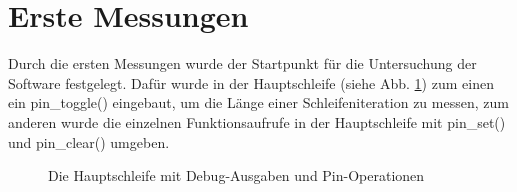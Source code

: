 \section{Erste Messungen}
Durch die ersten Messungen wurde der Startpunkt für die Untersuchung der Software
festgelegt. Dafür wurde in der Hauptschleife (siehe Abb. \ref{main_loop_full}) zum einen
ein pin\_toggle() eingebaut, um die Länge einer Schleifeniteration zu messen, zum anderen
wurde die einzelnen Funktionsaufrufe in der Hauptschleife mit pin\_set() und pin\_clear()
umgeben.
\begin{figure}[htb]
 \centering
 \caption{\label{main_loop_full}Die Hauptschleife mit Debug-Ausgaben und Pin-Operationen}
\end{figure}
